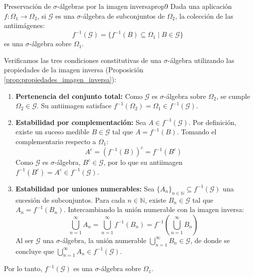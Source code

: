 \begin{center}
    \vspace{0.2cm}
    \vspace{0.2cm}
\end{center}

\begin{proposicion}{Preservación de $\sigma$-álgebras por la imagen inversa}{prop9}
Dada una aplicación $f: \Omega_1 \to \Omega_2$, si $\mathcal{G}$ es una $\sigma$-álgebra de subconjuntos de $\Omega_2$, la colección de las antiimágenes:
\[
    f^{-1}(\mathcal{G}) = \{ f^{-1}(B) \subseteq \Omega_1 \mid B \in \mathcal{G} \}
\]
es una $\sigma$-álgebra sobre $\Omega_1$.
\end{proposicion}

\begin{demostracion}
Verificamos las tres condiciones constitutivas de una $\sigma$-álgebra utilizando las propiedades de la imagen inversa (Proposición \ref{prop:propiedades_imagen_inversa}):
\begin{enumerate}[label=\arabic*.]
    \item \textbf{Pertenencia del conjunto total:} Como $\mathcal{G}$ es $\sigma$-álgebra sobre $\Omega_2$, se cumple $\Omega_2 \in \mathcal{G}$. Su antiimagen satisface $f^{-1}(\Omega_2) = \Omega_1 \in f^{-1}(\mathcal{G})$.
    \item \textbf{Estabilidad por complementación:} Sea $A \in f^{-1}(\mathcal{G})$. Por definición, existe un suceso medible $B \in \mathcal{G}$ tal que $A = f^{-1}(B)$. Tomando el complementario respecto a $\Omega_1$:
    \[
        A^c = (f^{-1}(B))^c = f^{-1}(B^c)
    \]
    Como $\mathcal{G}$ es $\sigma$-álgebra, $B^c \in \mathcal{G}$, por lo que su antiimagen $f^{-1}(B^c) = A^c \in f^{-1}(\mathcal{G})$.
    \item \textbf{Estabilidad por uniones numerables:} Sea $\{A_n\}_{n \in \mathbb{N}} \subseteq f^{-1}(\mathcal{G})$ una sucesión de subconjuntos. Para cada $n \in \mathbb{N}$, existe $B_n \in \mathcal{G}$ tal que $A_n = f^{-1}(B_n)$. Intercambiando la unión numerable con la imagen inversa:
    \[
        \bigcup_{n=1}^\infty A_n = \bigcup_{n=1}^\infty f^{-1}(B_n) = f^{-1}\left( \bigcup_{n=1}^\infty B_n \right)
    \]
    Al ser $\mathcal{G}$ una $\sigma$-álgebra, la unión numerable $\bigcup_{n=1}^\infty B_n \in \mathcal{G}$, de donde se concluye que $\bigcup_{n=1}^\infty A_n \in f^{-1}(\mathcal{G})$.
\end{enumerate}
Por lo tanto, $f^{-1}(\mathcal{G})$ es una $\sigma$-álgebra sobre $\Omega_1$.
\end{demostracion}

